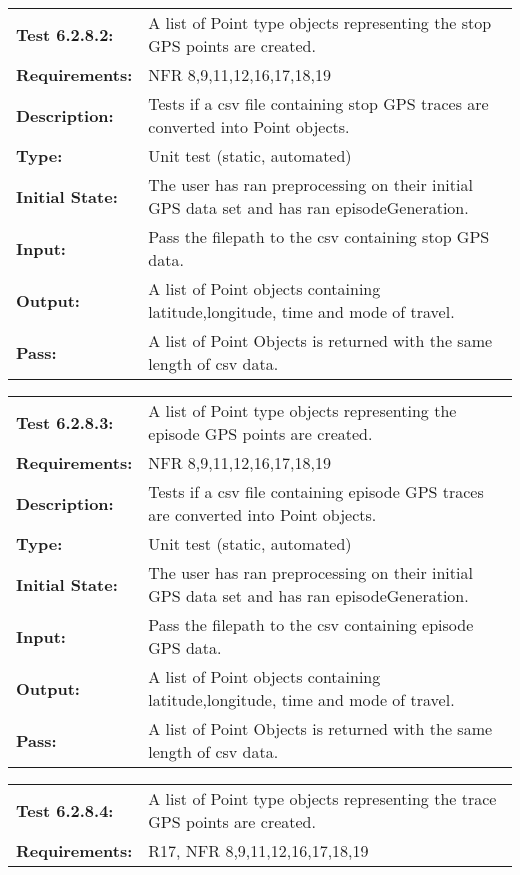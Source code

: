 \documentclass[12pt, titlepage]{article}
\begin{document}
{\begin{tabular}{|l|p{10cm}|}
    \hline
    \bf{Test} 6.2.8.2: & A list of Point type objects representing the stop GPS points are created.\\
    \bf{Requirements}: & NFR 8,9,11,12,16,17,18,19 \\
    \bf{Description}: & Tests if a csv file containing stop GPS traces are converted into Point objects. \\
    \bf{Type}: & Unit test (static, automated) \\
    \bf{Initial State}: & The user has ran preprocessing on their initial GPS data set and has ran episodeGeneration. \\
    \bf{Input}: & Pass the filepath to the csv containing stop GPS data.\\
    \bf{Output}: & A list of Point objects containing latitude,longitude, time and mode of travel.\\
    \bf{Pass}: & A list of Point Objects is returned with the same length of csv data.\\
    \hline
\end{tabular}
\begin{tabular}{|l|p{10cm}|}
    \hline
    \bf{Test} 6.2.8.3: & A list of Point type objects representing the episode GPS points are created.\\
    \bf{Requirements}: & NFR 8,9,11,12,16,17,18,19 \\
    \bf{Description}: & Tests if a csv file containing episode GPS traces are converted into Point objects. \\
    \bf{Type}: & Unit test (static, automated) \\
    \bf{Initial State}: & The user has ran preprocessing on their initial GPS data set and has ran episodeGeneration. \\
    \bf{Input}: & Pass the filepath to the csv containing episode GPS data.\\
    \bf{Output}: & A list of Point objects containing latitude,longitude, time and mode of travel.\\
    \bf{Pass}: & A list of Point Objects is returned with the same length of csv data.\\
    \hline
\end{tabular}
\begin{tabular}{|l|p{10cm}|}
    \hline
    \bf{Test} 6.2.8.4: & A list of Point type objects representing the trace GPS points are created.\\
    \bf{Requirements}: & R17, NFR 8,9,11,12,16,17,18,19\\

\end{tabular}}
\end{document}
